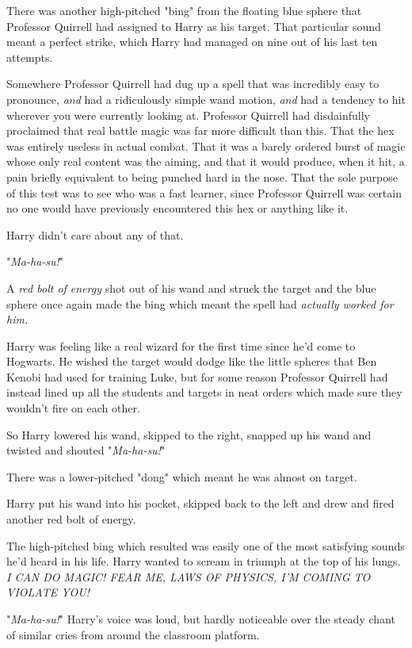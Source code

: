 There was another high-pitched "bing" from the floating blue sphere that
Professor Quirrell had assigned to Harry as his target. That particular sound
meant a perfect strike, which Harry had managed on nine out of his last ten
attempts.

Somewhere Professor Quirrell had dug up a spell that was incredibly easy to
pronounce, \emph{and} had a ridiculously simple wand motion, \emph{and} had a
tendency to hit wherever you were currently looking at. Professor Quirrell had
disdainfully proclaimed that real battle magic was far more difficult than
this. That the hex was entirely useless in actual combat. That it was a barely
ordered burst of magic whose only real content was the aiming, and that it
would produce, when it hit, a pain briefly equivalent to being punched hard in
the nose. That the sole purpose of this test was to see who was a fast learner,
since Professor Quirrell was certain no one would have previously encountered
this hex or anything like it.

Harry didn’t care about any of that.

"\emph{Ma-ha-su!}"

A \emph{red bolt of energy} shot out of his wand and struck the target and the
blue sphere once again made the bing which meant the spell had \emph{actually
worked for him.}

Harry was feeling like a real wizard for the first time since he’d come to
Hogwarts. He wished the target would dodge like the little spheres that Ben
Kenobi had used for training Luke, but for some reason Professor Quirrell had
instead lined up all the students and targets in neat orders which made sure
they wouldn’t fire on each other.

So Harry lowered his wand, skipped to the right, snapped up his wand and
twisted and shouted "\emph{Ma-ha-su!}"

There was a lower-pitched "dong" which meant he was almost on target.

Harry put his wand into his pocket, skipped back to the left and drew and fired
another red bolt of energy.

The high-pitched bing which resulted was easily one of the most satisfying
sounds he’d heard in his life. Harry wanted to scream in triumph at the top of
his lungs. \emph{I CAN DO MAGIC! FEAR ME, LAWS OF PHYSICS, I’M COMING TO
VIOLATE YOU!}

"\emph{Ma-ha-su!}" Harry’s voice was loud, but hardly noticeable over the
steady chant of similar cries from around the classroom platform.

